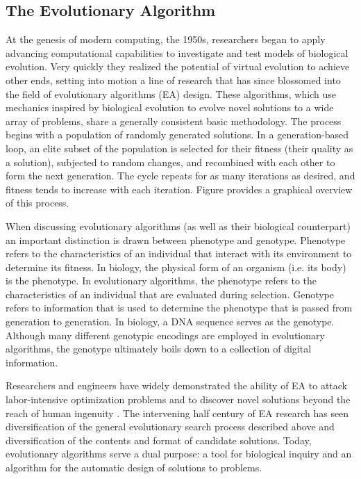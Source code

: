 
\subsection{The Evolutionary Algorithm}


At the genesis of modern computing, the 1950s, researchers began to apply advancing computational capabilities to investigate and test models of biological evolution. Very quickly they realized the potential of virtual evolution to achieve other ends, setting into motion a line of research that has since blossomed into the field of evolutionary algorithms (EA) design. These algorithms, which use mechanics inspired by biological evolution to evolve novel solutions to a wide array of problems, share a generally consistent basic methodology. The process begins with a population of randomly generated solutions. In a generation-based loop, an elite subset of the population is selected for their fitness (their quality as a solution), subjected to random changes, and recombined with each other to form the next generation. The cycle repeats for as many iterations as desired, and fitness tends to increase with each iteration. Figure  provides a graphical overview of this process.

When discussing evolutionary algorithms (as well as their biological counterpart) an important distinction is drawn between phenotype and genotype. Phenotype refers to the characteristics of an individual that interact with its environment to determine its fitness. In biology, the physical form of an organism (i.e. its body) is the phenotype. In evolutionary algorithms, the phenotype refers to the characteristics of an individual that are evaluated during selection. Genotype refers to information that is used to determine the phenotype that is passed from generation to generation. In biology, a DNA sequence serves as the genotype. Although many different genotypic encodings are employed in evolutionary algorithms, the genotype ultimately boils down to a collection of digital information.

Researchers and engineers have widely demonstrated the ability of EA to attack labor-intensive optimization problems and to discover novel solutions beyond the reach of human ingenuity \cite{Poli2008AProgramming}. The intervening half century of EA research has seen diversification of the general evolutionary search process described above and diversification of the contents and format of candidate solutions. Today, evolutionary algorithms serve a dual purpose: a tool for biological inquiry and an algorithm for the automatic design of solutions to problems.

